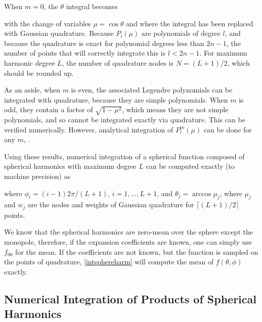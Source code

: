 When $m=0$, the $\theta$ integral becomes 

with the change of variables $\mu = \cos\theta$ and where the integral has been replaced with Gaussian quadrature. Because $P_l(\mu)$ are polynomials of degree $l$, and because the quadrature is exact for polynomial degrees less than $2n-1$, the number of points that will correctly integrate this is $ l  < 2 n - 1$. For maximum harmonic degree $L$, the number of quadrature nodes is $N = (L+1)/2$, which should be rounded up.  
	
As an aside, when $m$ is even, the associated Legendre polynomials can be integrated with quadrature, because they are simple polynomials. When $m$ is odd, they contain a factor of $\sqrt{1-\mu^2}$, which means they are not simple polynomials, and so cannot be integrated exactly via quadrature. This can be verified numerically. However, analytical integration of $P_l^m(\mu)$ can be done for any $m$, \cite{beentjes2015quadrature,atkinson2012spherical}.


Using these results, numerical integration of a spherical function composed of spherical harmonics with maximum degree $L$ can be computed exactly (to machine precision) as 

\noindent where $\phi_i = (i-1)2\pi/(L+1)$, $i = 1,...,L+1$, and $\theta_j = \arccos\mu_j$, where $\mu_j$ and $w_j$ are the nodes and weights of Gaussian quadrature for $\lceil (L+1)/2 \rceil$ points.  

We know that the spherical harmonics are zero-mean over the sphere except the monopole, therefore, if the expansion coefficients are known, one can simply use $f_{00}$ for the mean. If the coefficients are not known, but the function is sampled on the points of quadrature, \eqref{intsphereharm} will compute the mean of $f(\theta,\phi)$ exactly.  

\subsection{Numerical Integration of Products of Spherical Harmonics}

